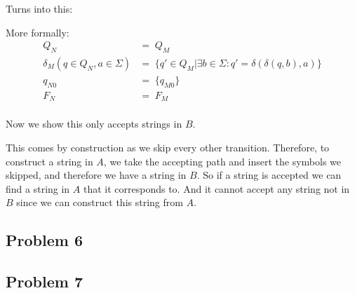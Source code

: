 \documentclass[english]{article}
\begin{document}
Turns into this:


More formally:
\begin{align*}
                              Q_N &=\; Q_M \\
 \delta_M(q \in Q_N,a \in \Sigma) &=\; \{ q' \in Q_M | \exists b \in \Sigma : q' = \delta(\delta(q,b),a) \} \\
                           q_{N0} &=\; \{q_{M0}\} \\
                              F_N &=\; F_M \\
\end{align*}

Now we show this only accepts strings in $B$. 

This comes by construction as we skip every other transition. Therefore, to construct a string in $A$, we take the accepting path and insert the symbols we skipped, and therefore we have a string in $B$. So if a string is accepted we can find a string in $A$ that it corresponds to. And it cannot accept any string not in $B$ since we can construct this string from $A$. 

\subsection*{Problem 6}

\subsection*{Problem 7}
\end{document}
